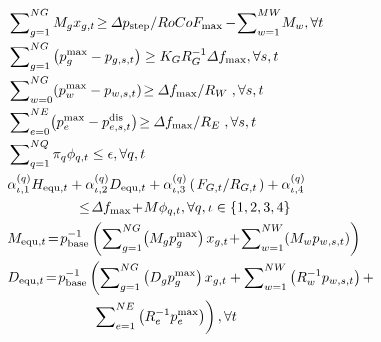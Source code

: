 \documentclass[lettersize,journal]{IEEEtran}
\newcommand{\slfrac}[2]{\left.#1\middle/#2\right.}
\newenvironment{newsubequations}{\small\begin{subequations}}{\end{subequations}}
\begin{document}
\vspace{-0.20cm}
\begin{newsubequations}\label{eqn:21}
	\begin{align}
		 & \sum\nolimits_{g=1}^{NG}M_{g} x_{g,t} \!\geq\! \slfrac{\varDelta p_{\text{step}} }{RoCoF_{\text{max}} } \!-\! \sum\nolimits_{w = 1}^{MW} \!M_{w}, \forall  t \qquad \,\, \label{21-a}                        \\
		 & \sum\nolimits_{g=1}^{NG} \left( p_{g}^{\text{max}} - p_{g, s, t}\right)\geq {{K_{G} }{ R_{G}^{-1}} \varDelta f_{\text{max}}}, \forall s,t \label{21-b}                                                       \\
		 & \sum\nolimits_{w=0}^{NG}\!\left( p_{w}^{\text{max}} - p_{w, s, t}\right)\!\geq \!\slfrac{\varDelta f_{\text{max}}}{R_W},\forall s,t  \label{21-c}                                                            \\
		 & \sum\nolimits_{e=0}^{NE} \! \left( p_{e}^{\text{max}} - p_{e, s, t}^{\text{dis}}\right)\!\geq \! \slfrac{\varDelta f_{\text{max}}}{R_E},\forall s,t \label{21-d}                                             \\
		 & \sum\nolimits_{q=1}^{NQ} \pi_{q} \phi_{q,t} \leq \epsilon, \forall q,t \label{21-e}                                                                                                                          \\
		 & \alpha_{\iota,1}^{(q)}{H}_{\text{equ},t} + \alpha_{\iota,2}^{(q)} {D}_{\text{equ},t} + \alpha_{\iota,3}^{(q)}\left(\slfrac{{F}_{G,t}}{{R}_{G,t} }\right) + \alpha_{\iota,4}^{(q)} \label{21-f}               \\
		 & \qquad \qquad \quad   \!\leq \!\varDelta f_{\text{max}} \!+\! M \phi_{q,t},\forall q \notag, \iota\in\{1,2,3,4\}                                                                                             \\
		 & M_{\text{equ},t}\! = \! p_{\text{base}}^{-1}\left(\sum\nolimits_{g = 1}^{NG}\!\left(M_{g}p_{g}^{\text{max}}\right)x_{g,t} \!+\! \sum\nolimits_{w= 1}^{NW} \!\left(M_{w} p_{w,s,t}\right)\right) \label{21-g} \\
		 & D_{\text{equ},t}\! = \! p_{\text{base}}^{-1}\left(\sum\nolimits_{g = 1}^{NG}\left(D_{g} p_{g}^{\text{max}}\right)x_{g,t} + \sum\nolimits_{w= 1}^{NW} \left(R_{w}^{-1} p_{w,s,t}\right) + \right.\notag       \\
		 & \qquad\qquad \qquad \left. \sum\nolimits_{e = 1}^{NE} \left(R_{e}^{-1} p_{e}^{\text{max}}\right)\right), \forall t \label{21-h}                                                                              \\

\end{align}
\end{newsubequations}
\end{document}
